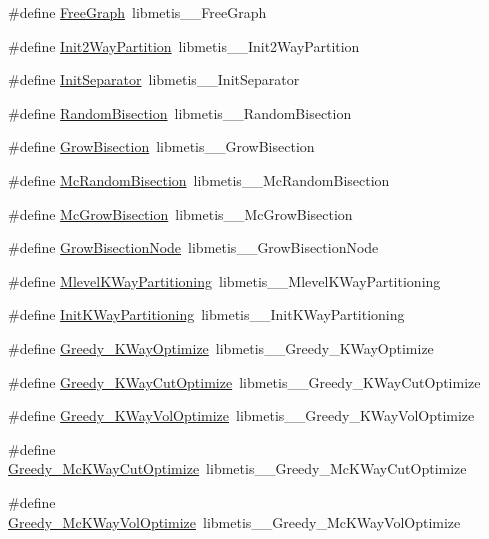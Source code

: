 \begin{DoxyCompactItemize}
\item 
\#define \hyperlink{a00957_a6e9acb09cd52f2f13ba10dee86986a53}{Free\+Graph}~libmetis\+\_\+\+\_\+\+Free\+Graph
\item 
\#define \hyperlink{a00957_aa8841fe98a6a258f462b312690c3adcb}{Init2\+Way\+Partition}~libmetis\+\_\+\+\_\+\+Init2\+Way\+Partition
\item 
\#define \hyperlink{a00957_afcd14381d48f5c679d39a33a2d98721c}{Init\+Separator}~libmetis\+\_\+\+\_\+\+Init\+Separator
\item 
\#define \hyperlink{a00957_a65d28f92f1fd9a7d42bde5e46228c93a}{Random\+Bisection}~libmetis\+\_\+\+\_\+\+Random\+Bisection
\item 
\#define \hyperlink{a00957_a034a06eaa9bbecbba9652261c203515a}{Grow\+Bisection}~libmetis\+\_\+\+\_\+\+Grow\+Bisection
\item 
\#define \hyperlink{a00957_a272135f8698859e36a7a5cec126a635f}{Mc\+Random\+Bisection}~libmetis\+\_\+\+\_\+\+Mc\+Random\+Bisection
\item 
\#define \hyperlink{a00957_afe2453cfcd5463bdb345de0d98d53b49}{Mc\+Grow\+Bisection}~libmetis\+\_\+\+\_\+\+Mc\+Grow\+Bisection
\item 
\#define \hyperlink{a00957_adec06d0afed71b6d9f3335af549e025c}{Grow\+Bisection\+Node}~libmetis\+\_\+\+\_\+\+Grow\+Bisection\+Node
\item 
\#define \hyperlink{a00957_a038837c78313442c6ecb979c29282464}{Mlevel\+K\+Way\+Partitioning}~libmetis\+\_\+\+\_\+\+Mlevel\+K\+Way\+Partitioning
\item 
\#define \hyperlink{a00957_a937ad6d4dfb55dd3cdaf743956c5ddbd}{Init\+K\+Way\+Partitioning}~libmetis\+\_\+\+\_\+\+Init\+K\+Way\+Partitioning
\item 
\#define \hyperlink{a00957_ac52c9c22801d17fee94320d582d02dff}{Greedy\+\_\+\+K\+Way\+Optimize}~libmetis\+\_\+\+\_\+\+Greedy\+\_\+\+K\+Way\+Optimize
\item 
\#define \hyperlink{a00957_a44c0b1ed9a7c641191eb4d08c1976b22}{Greedy\+\_\+\+K\+Way\+Cut\+Optimize}~libmetis\+\_\+\+\_\+\+Greedy\+\_\+\+K\+Way\+Cut\+Optimize
\item 
\#define \hyperlink{a00957_a53b1e8da078bd8b41dcd95d8cf16f2f5}{Greedy\+\_\+\+K\+Way\+Vol\+Optimize}~libmetis\+\_\+\+\_\+\+Greedy\+\_\+\+K\+Way\+Vol\+Optimize
\item 
\#define \hyperlink{a00957_a4a70e69d684fd5160fe936af33bab326}{Greedy\+\_\+\+Mc\+K\+Way\+Cut\+Optimize}~libmetis\+\_\+\+\_\+\+Greedy\+\_\+\+Mc\+K\+Way\+Cut\+Optimize
\item 
\#define \hyperlink{a00957_a423fc7600fb38b3e54eceeb5eba2abd7}{Greedy\+\_\+\+Mc\+K\+Way\+Vol\+Optimize}~libmetis\+\_\+\+\_\+\+Greedy\+\_\+\+Mc\+K\+Way\+Vol\+Optimize

\end{DoxyCompactItemize}
